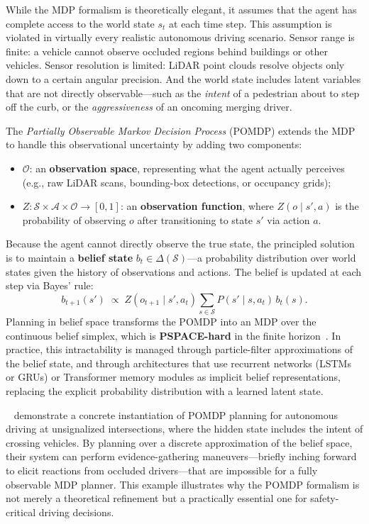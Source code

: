 \documentclass[12pt, a4paper]{article}
\begin{document}
While the MDP formalism is theoretically elegant, it assumes that the agent
has complete access to the world state $s_t$ at each time step.  This assumption
is violated in virtually every realistic autonomous driving scenario.
Sensor range is finite: a vehicle cannot observe occluded regions behind
buildings or other vehicles.  Sensor resolution is limited: LiDAR point clouds
resolve objects only down to a certain angular precision.  And the world state
includes latent variables that are not directly observable---such as the
\emph{intent} of a pedestrian about to step off the curb, or the
\emph{aggressiveness} of an oncoming merging driver.

The \emph{Partially Observable Markov Decision Process} (POMDP) extends the
MDP to handle this observational uncertainty by adding two components:
\begin{itemize}[noitemsep]
  \item $\mathcal{O}$: an \textbf{observation space}, representing what the
        agent actually perceives (e.g., raw LiDAR scans, bounding-box
        detections, or occupancy grids);
  \item $Z: \mathcal{S} \times \mathcal{A} \times \mathcal{O} \to [0,1]$: an
        \textbf{observation function}, where $Z(o \mid s', a)$ is the probability
        of observing $o$ after transitioning to state $s'$ via action $a$.
\end{itemize}
Because the agent cannot directly observe the true state, the principled
solution is to maintain a \textbf{belief state}
$b_t \in \Delta(\mathcal{S})$---a probability distribution over world states
given the history of observations and actions.  The belief is updated at each
step via Bayes' rule:
\[
  b_{t+1}(s') \;\propto\;
  Z(o_{t+1} \mid s', a_t)\!
  \sum_{s \in \mathcal{S}} P(s' \mid s, a_t)\, b_t(s).
\]
Planning in belief space transforms the POMDP into an MDP over the continuous
belief simplex, which is \textbf{PSPACE-hard} in the finite
horizon~\cite{hubmann2018automated}.  In practice, this intractability is
managed through particle-filter approximations of the belief state, and through
architectures that use recurrent networks (LSTMs or GRUs) or Transformer memory
modules as implicit belief representations, replacing the explicit probability
distribution with a learned latent state.

\citeauthor{hubmann2018automated}~\cite{hubmann2018automated} demonstrate a
concrete instantiation of POMDP planning for autonomous driving at unsignalized
intersections, where the hidden state includes the intent of crossing vehicles.
By planning over a discrete approximation of the belief space, their system can
perform evidence-gathering maneuvers---briefly inching forward to elicit
reactions from occluded drivers---that are impossible for a fully observable MDP
planner.  This example illustrates why the POMDP formalism is not merely a
theoretical refinement but a practically essential one for safety-critical
driving decisions.
\end{document}
